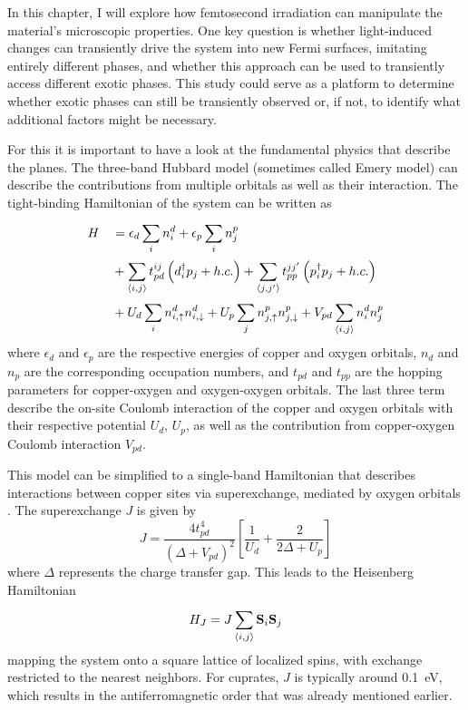 In this chapter, I will explore how femtosecond irradiation can manipulate the material's microscopic properties.
One key question is whether light-induced changes can transiently drive the system into new Fermi surfaces, imitating entirely different phases, and whether this approach can be used to transiently access different exotic phases.
This study could serve as a platform to determine whether exotic phases can still be transiently observed or, if not, to identify what additional factors might be necessary.

For this it is important to have a look at the fundamental physics that describe the  planes.
The three-band Hubbard model (sometimes called Emery model) can describe the contributions from multiple orbitals as well as their interaction\cite{avella_emery_2013,emery_theory_1987,ogata_tj_2008}.
The tight-binding Hamiltonian of the system can be written as
\begin{equation}
\begin{split}
	H &\quad = \epsilon_d \sum_{i}^{} n_i^d + \epsilon_p \sum_{i}^{} n_j^p \\
	  &\quad + \sum_{\braket{i,j}}^{} t_{pd}^{ij} \left(d_i^\dagger p_j + h.c.\right) + \sum_{\braket{j,j'}}^{} t_{pp}^{jj'} \left(p_i^\dagger p_j + h.c.\right)\\
	  &\quad + U_d \sum_{i}^{} n_{i,\uparrow}^d n_{i,\downarrow}^d + U_p \sum_{j}^{} n_{j,\uparrow}^p n_{j,\downarrow}^p + V_{pd} \sum_{\braket{i,j}}^{} n_i^d n_j^p
\end{split}
\end{equation}
where $\epsilon_d$ and $\epsilon_p$ are the respective energies of copper and oxygen orbitals, $n_d$ and $n_p$ are the corresponding occupation numbers, and $t_{pd}$ and $t_{pp}$ are the hopping parameters for copper-oxygen and oxygen-oxygen orbitals.
The last three term describe the on-site Coulomb interaction of the copper and oxygen orbitals with their respective potential $U_d$, $U_p$, as well as the contribution from copper-oxygen Coulomb interaction $V_{pd}$.

This model can be simplified to a single-band Hamiltonian that describes interactions between copper sites via superexchange, mediated by oxygen orbitals \cite{anderson_new_1959, zhang_effective_1988, emery_mechanism_1988}.
The superexchange $J$ is given by
\begin{equation}
	J= \frac{4t_{pd}^4}{\left(\Delta + V_{pd} \right)^2} \left[\frac{1}{U_d} + \frac{2}{2\Delta + U_p}\right]
\end{equation}
where $\Delta$ represents the charge transfer gap.
This leads to the Heisenberg Hamiltonian
\begin{equation}
	H_J = J \sum_{\braket{i,j}}^{} \mathbf{S}_i \mathbf{S}_j
\end{equation}
mapping the system onto a square lattice of localized spins, with exchange restricted to the nearest neighbors.
For cuprates, $J$ is typically around \qty{0.1}{\electronvolt}, which results in the antiferromagnetic order that was already mentioned earlier.

